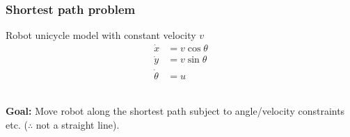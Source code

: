 \subsubsection{Shortest path problem}
    \begin{minipage}{.5\columnwidth}
    Robot unicycle model with constant velocity $v$
    \begin{align*}
    \dot{x} &= v \cos \theta\\
    \dot{y}    &= v \sin \theta\\
    \dot{\theta} &= u
    \end{align*}
    \vfill ~
    \end{minipage} \hfill
    \begin{minipage}{0.39\columnwidth}
    \centering
    \label{fig:unicycle-system}
    \end{minipage}

\textbf{Goal:}
Move robot along the shortest path
subject to angle/velocity constraints etc.
($\therefore$ not a straight line).\\


